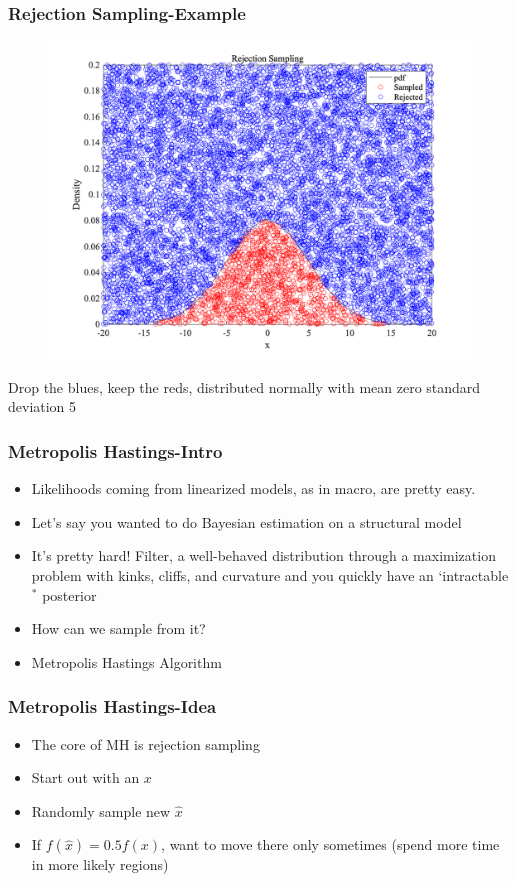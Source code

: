 \documentclass{beamer}
\begin{document}
\begin{frame}
\frametitle[alignment=center]{Rejection Sampling-Example}
\begin{figure}
\centering
\includegraphics[scale=0.24]{RejectionSampling.png}
\end{figure}
Drop the blues, keep the reds, distributed normally with mean zero standard deviation 5
\end{frame}


\begin{frame}
\frametitle[alignment=center]{Metropolis Hastings-Intro}
\begin{itemize}
\item Likelihoods coming from linearized models, as in macro, are pretty easy.
\bigskip
\item Let's say you wanted to do Bayesian estimation on a structural model
\bigskip
\item It's pretty hard!  Filter, a well-behaved distribution through a maximization problem with kinks, cliffs, and curvature and you quickly have an `intractable$^*$ posterior
\bigskip
\item How can we sample from it?
\bigskip
\item Metropolis Hastings Algorithm 
\end{itemize}
\end{frame}

\begin{frame}
\frametitle[alignment=center]{Metropolis Hastings-Idea}
\begin{itemize}
\item The core of MH is rejection sampling
\bigskip
\item Start out with an $x$
\bigskip
\item Randomly sample new $\hat{x}$
\bigskip
\item If  $f(\hat{x})=0.5 f(x)$, want to move there only sometimes (spend more time in more likely regions)
\bigskip
\end{itemize}
\end{frame}
\end{document}
